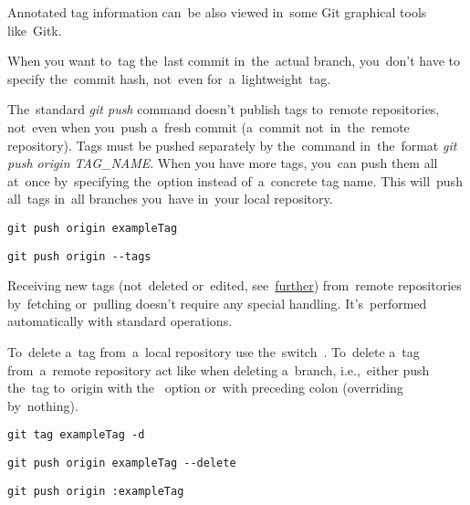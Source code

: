 \noindent Annotated tag information can~be also viewed in~some Git graphical tools like~Gitk.

\note When you want to~tag the~last commit in~the~actual branch, you~don't have to specify the~commit hash, not~even for~a~lightweight~tag.

The~standard \textit{git push} command doesn't publish tags to~remote repositories, not~even when you~push a~fresh commit (a~commit not~in~the~remote repository).
Tags must be pushed separately by the~command in~the~format \textit{git push origin TAG\_NAME}.
When you have more tags, you~can push them all at~once by~specifying the~option  instead of~a~concrete tag name.
This will~push all~tags in~all branches you~have in~your local repository.

\begin{lstlisting}[frame=no]
    git push origin exampleTag
\end{lstlisting}

\begin{lstlisting}[frame=no]
    git push origin --tags
\end{lstlisting}

\note Receiving new tags (not~deleted or~edited, see~\hyperref[gittagsynchronization]{further}) from~remote repositories by~fetching or~pulling doesn't require any special handling.
It's~performed automatically with standard operations.

To~delete a~tag from~a~local repository use the~switch~.
To~delete a~tag from~a~remote repository act like when deleting a~branch, i.e.,~either push the~tag to~origin with the~ option or~with preceding colon (overriding by~nothing).

\begin{lstlisting}[frame=no]
    git tag exampleTag -d
\end{lstlisting}

\begin{lstlisting}[frame=no]
    git push origin exampleTag --delete
\end{lstlisting}

\begin{lstlisting}[frame=no]
    git push origin :exampleTag
\end{lstlisting}

